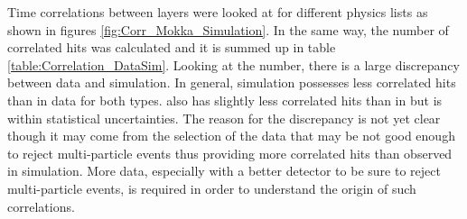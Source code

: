 Time correlations between layers were looked at for different physics lists as shown in figures \ref{fig:Corr_Mokka_Simulation}. In the same way, the number of correlated hits was calculated and it is summed up in table \ref{table:Correlation_DataSim}. Looking at the number, there is a large discrepancy between data and simulation. In general, simulation possesses less correlated hits than in data for both types. \ddhep also has slightly less correlated hits than in \mokka but is within statistical uncertainties. The reason for the discrepancy is not yet clear though it may come from the selection of the data that may be not good enough to reject multi-particle events thus providing more correlated hits than observed in simulation. More data, especially with a better detector to be sure to reject multi-particle events, is required in order to understand the origin of such correlations.

